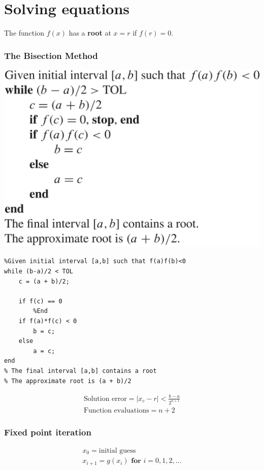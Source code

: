 \section{Solving equations}
\begin{definition}
The function $f(x)$ has a \textbf{root} at $x = r$ if $f(r) = 0$.
\end{definition}

\subsubsection{The Bisection Method}
\includegraphics[scale=0.16]{images/bisection_method.png}

\begin{lstlisting}
%Given initial interval [a,b] such that f(a)f(b)<0
while (b-a)/2 < TOL
    c = (a + b)/2;
    
    if f(c) == 0
        %End
    if f(a)*f(c) < 0
        b = c;
    else
        a = c;
end
% The final interval [a,b] contains a root
% The approximate root is (a + b)/2
\end{lstlisting}
\begin{gather*}
\text{Solution error} = |x_c - r| < \frac{b-a}{2^{n+1}} \\
\text{Function evaluations} = n + 2
\end{gather*}
\subsubsection{Fixed point iteration}
\begin{gather*}
x_0 = \text{initial guess} \\
x_{i+1} = g(x_i) \textbf{ for } i = 0,1,2,... \\
\end{gather*}

